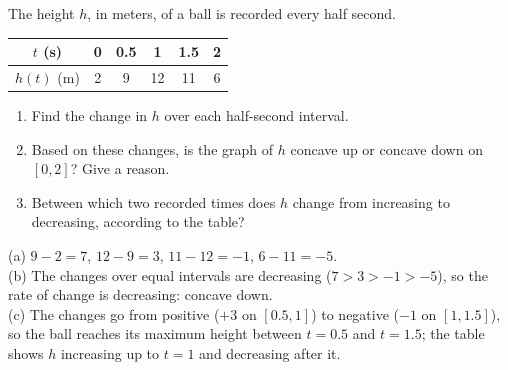 \begin{exo}{}
The height $h$, in meters, of a ball is recorded every half second.
\begin{center}\begin{tabular}{c|ccccc}$t$ (s)&0&0.5&1&1.5&2\\\hline$h(t)$ (m)&2&9&12&11&6\end{tabular}\end{center}
\begin{enumerate}[label=(\alph*)]
\item Find the change in $h$ over each half-second interval.
\item Based on these changes, is the graph of $h$ concave up or concave down on $[0,2]$? Give a reason.
\item Between which two recorded times does $h$ change from increasing to decreasing, according to the table?
\end{enumerate}
\begin{solution}
(a) $9-2=7$, $12-9=3$, $11-12=-1$, $6-11=-5$.\\
(b) The changes over equal intervals are decreasing ($7>3>-1>-5$), so the rate of change is decreasing: concave down.\\
(c) The changes go from positive ($+3$ on $[0.5,1]$) to negative ($-1$ on $[1,1.5]$), so the ball reaches its maximum height between $t=0.5$ and $t=1.5$; the table shows $h$ increasing up to $t=1$ and decreasing after it.
\end{solution}
\end{exo}

